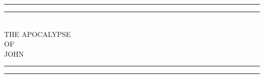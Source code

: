 \thispagestyle{empty}
\begin{center}
	\hspace{0pt}
	\vfill
	\textheight
    \centering
    \vspace*{\baselineskip}
    \rule{\textwidth}{1.6pt}\vspace*{-\baselineskip}\vspace*{2pt}
    \rule{\textwidth}{0.4pt}\\[\baselineskip]
    {\LARGE THE APOCALYPSE \\ OF \\[0.3\baselineskip] JOHN }\\[0.2\baselineskip]
    \rule{\textwidth}{0.4pt}\vspace*{-\baselineskip}\vspace{3.2pt}
    \rule{\textwidth}{1.6pt}\\[\baselineskip]
    \vfill
\end{center}